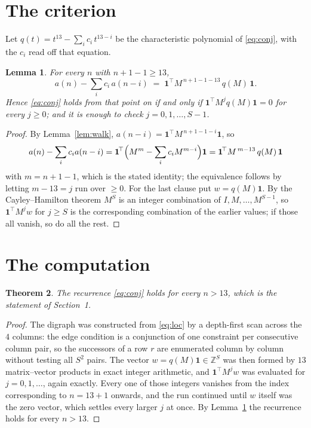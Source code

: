 \documentclass[11pt,a4paper]{article}
\theoremstyle{plain}
\newtheorem{theorem}{Theorem}
\newtheorem{lemma}[theorem]{Lemma}
\theoremstyle{definition}
\begin{document}
\section{The criterion}

Let $q(t)=t^{13}-\sum_i c_i\,t^{13-i}$ be the characteristic polynomial of
\eqref{eq:conj}, with the $c_i$ read off that equation.

\begin{lemma}\label{lem:crit}
For every $n$ with $n+1-1\ge13$,
\[
a(n)-\sum_i c_i\,a(n-i)\;=\;\mathbf{1}^{\!\top}M^{\,n+1-1-13}\,q(M)\,\mathbf{1} .
\]
Hence \eqref{eq:conj} holds from that point on if and only if
$\mathbf{1}^{\!\top}M^{j}q(M)\mathbf{1}=0$ for every $j\ge0$; and it is enough to check
$j=0,1,\dots,S-1$.
\end{lemma}

\begin{proof}
By Lemma~\ref{lem:walk}, $a(n-i)=\mathbf{1}^{\!\top}M^{\,n+1-1-i}\mathbf{1}$, so
\[
a(n)-\sum_i c_i a(n-i)
=\mathbf{1}^{\!\top}\Bigl(M^{m}-\sum_i c_i M^{m-i}\Bigr)\mathbf{1}
=\mathbf{1}^{\!\top}M^{\,m-13}\,q(M)\,\mathbf{1}
\]
with $m=n+1-1$, which is the stated identity; the equivalence follows by letting
$m-13=j$ run over $\ge0$. For the last clause put $w=q(M)\mathbf{1}$. By the
Cayley--Hamilton theorem $M^{S}$ is an integer combination of $I,M,\dots,M^{S-1}$, so
$\mathbf{1}^{\!\top}M^{j}w$ for $j\ge S$ is the corresponding combination of the earlier
values; if those all vanish, so do all the rest.
\end{proof}

\section{The computation}

\begin{theorem}
The recurrence \eqref{eq:conj} holds for every $n>13$, which is the statement of
Section~1.
\end{theorem}

\begin{proof}
The digraph was constructed from \eqref{eq:loc} by a depth-first scan across the $4$
columns: the edge condition is a conjunction of one constraint per consecutive column
pair, so the successors of a row $r$ are enumerated column by column without testing all
$S^2$ pairs. The vector $w=q(M)\mathbf{1}\in\mathbb{Z}^{S}$ was then formed by $13$
matrix--vector products in exact integer arithmetic, and $\mathbf{1}^{\!\top}M^{j}w$ was
evaluated for $j=0,1,\dots$, again exactly. Every one of those integers vanishes from the
index corresponding to $n=13+1$ onwards, and the run continued until $w$ itself was the
zero vector, which settles every larger $j$ at once. By Lemma~\ref{lem:crit} the recurrence
holds for every $n>13$.
\end{proof}
\end{document}
